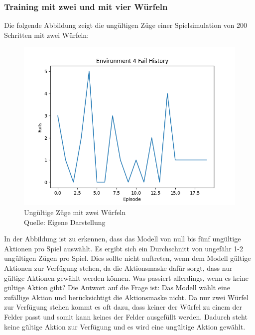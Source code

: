 \subsubsection{Training mit zwei und mit vier Würfeln}
Die folgende Abbildung zeigt die ungültigen Züge einer Spielsimulation von 200 Schritten mit zwei Würfeln:
\nopagebreak
\begin{figure}[H]
	\includegraphics[width=1\textwidth]{Bilder/failswithtwodice} 
	\caption[Ungültige Züge mit zwei Würfeln]{Ungültige Züge mit zwei Würfeln\\ Quelle: Eigene Darstellung}
\end{figure}

In der Abbildung ist zu erkennen, dass das Modell von null bis fünf ungültige Aktionen pro Spiel auswählt. Es ergibt sich ein Durchschnitt von ungefähr 1-2 ungültigen Zügen pro Spiel. Dies sollte nicht auftreten, wenn dem Modell gültige Aktionen zur Verfügung stehen, da die Aktionsmaske dafür sorgt, dass nur gültige Aktionen gewählt werden können. Was passiert allerdings, wenn es keine gültige Aktion gibt? Die Antwort auf die Frage ist: Das Modell wählt eine zufällige Aktion und berücksichtigt die Aktionsmaske nicht. Da nur zwei Würfel zur Verfügung stehen kommt es oft dazu, dass keiner der Würfel zu einem der Felder passt und somit kann keines der Felder ausgefüllt werden. Dadurch steht keine gültige Aktion zur Verfügung und es wird eine ungültige Aktion gewählt.\\

